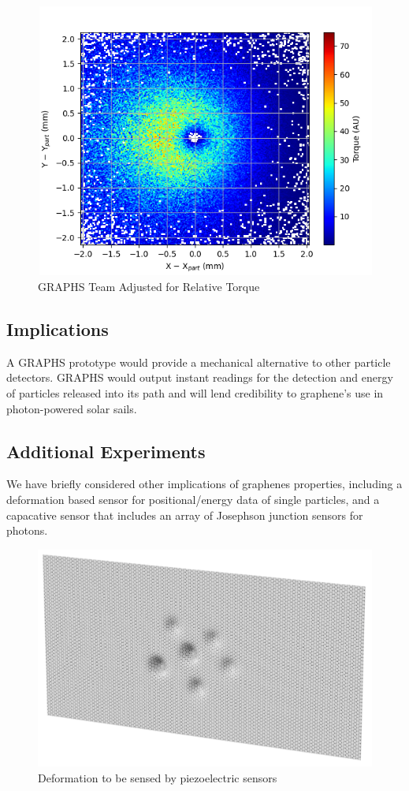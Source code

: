 \documentclass{article}
\begin{document}
\begin{figure}[H]
\includegraphics[scale=0.5]{our.png}
\caption{GRAPHS Team Adjusted for Relative Torque}
\end{figure}

    \subsection{Implications}

\indent A GRAPHS prototype would provide a mechanical alternative to other particle detectors. GRAPHS would output instant readings for the detection and energy of particles released into its path and will lend credibility to graphene's use in photon-powered solar sails.

\subsection{Additional Experiments}

\indent We have briefly considered other implications of graphenes properties, including a deformation based sensor for positional/energy data of single particles, and a capacative sensor that includes an array of Josephson junction sensors for photons.

\begin{figure}[H]
\includegraphics[scale=0.15]{deform.png}
\caption{Deformation to be sensed by piezoelectric sensors}
\end{figure}
\end{document}
